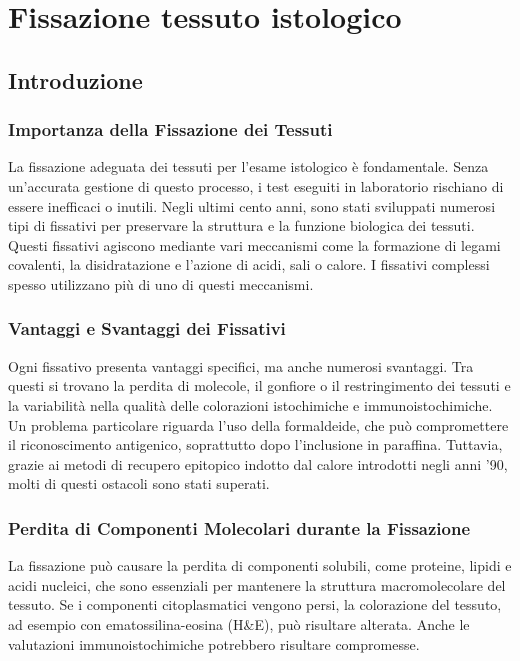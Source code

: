 \chapter{Fissazione tessuto istologico}

\section{Introduzione}


\subsection{Importanza della Fissazione dei Tessuti}
La fissazione adeguata dei tessuti per l'esame istologico è fondamentale. Senza un'accurata gestione di questo processo, i test eseguiti in laboratorio rischiano di essere inefficaci o inutili. Negli ultimi cento anni, sono stati sviluppati numerosi tipi di fissativi per preservare la struttura e la funzione biologica dei tessuti. Questi fissativi agiscono mediante vari meccanismi come la formazione di legami covalenti, la disidratazione e l'azione di acidi, sali o calore. I fissativi complessi spesso utilizzano più di uno di questi meccanismi.

\subsection{Vantaggi e Svantaggi dei Fissativi}
Ogni fissativo presenta vantaggi specifici, ma anche numerosi svantaggi. Tra questi si trovano la perdita di molecole, il gonfiore o il restringimento dei tessuti e la variabilità nella qualità delle colorazioni istochimiche e immunoistochimiche. Un problema particolare riguarda l'uso della formaldeide, che può compromettere il riconoscimento antigenico, soprattutto dopo l'inclusione in paraffina. Tuttavia, grazie ai metodi di recupero epitopico indotto dal calore introdotti negli anni '90, molti di questi ostacoli sono stati superati.

\subsection{Perdita di Componenti Molecolari durante la Fissazione}
La fissazione può causare la perdita di componenti solubili, come proteine, lipidi e acidi nucleici, che sono essenziali per mantenere la struttura macromolecolare del tessuto. Se i componenti citoplasmatici vengono persi, la colorazione del tessuto, ad esempio con ematossilina-eosina (H&E), può risultare alterata. Anche le valutazioni immunoistochimiche potrebbero risultare compromesse.

